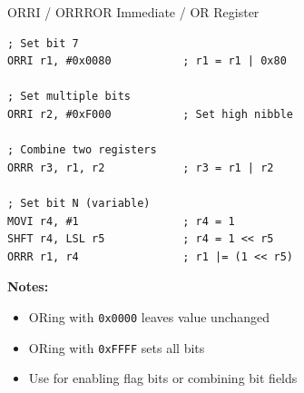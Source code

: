 \begin{instructionbox}{ORRI / ORRR}{OR Immediate / OR Register}
	\begin{example}
		\begin{lstlisting}
; Set bit 7
ORRI r1, #0x0080           ; r1 = r1 | 0x80

; Set multiple bits
ORRI r2, #0xF000           ; Set high nibble

; Combine two registers
ORRR r3, r1, r2            ; r3 = r1 | r2

; Set bit N (variable)
MOVI r4, #1                ; r4 = 1
SHFT r4, LSL r5            ; r4 = 1 << r5
ORRR r1, r4                ; r1 |= (1 << r5)
		\end{lstlisting}
		\caption{Setting Bits with OR}
	\end{example}

	\textbf{Notes:}
	\begin{itemize}
		\item ORing with \texttt{0x0000} leaves value unchanged
		\item ORing with \texttt{0xFFFF} sets all bits
		\item Use for enabling flag bits or combining bit fields
	\end{itemize}
\end{instructionbox}

